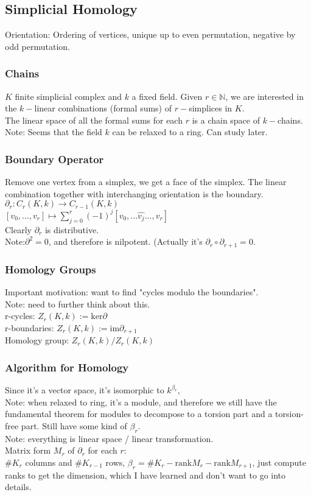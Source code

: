 \documentclass[10pt,a4paper]{report}
\begin{document}
\subsection{Simplicial Homology}
Orientation: Ordering of vertices, unique up to even permutation, negative by odd permutation.
\subsubsection{Chains}
$K$ finite simplicial complex and $k$ a fixed field. Given $r\in\mathbb{N}$, we are interested in the $k-$linear combinations (formal sums) of $r-$simplices in $K$.\\
The linear space of all the formal sums for each $r$ is a chain space of $k-$chains.\\
Note: Seems that the field $k$ can be relaxed to a ring. Can study later.\\
\subsubsection{Boundary Operator}
Remove one vertex from a simplex, we get a face of the simplex. The linear combination together with interchanging orientation is the boundary.\\
$\partial_r:C_r(K,k)\to C_{r-1}(K,k)$\\
$[v_0,...,v_r]\mapsto\sum_{j=0}^{r}(-1)^{j}[v_0,...\hat{v_j}...,v_r]$\\
Clearly $\partial_r$ is distributive.\\
Note:$\partial^2=0$, and therefore is nilpotent. (Actually it's $\partial_r\circ\partial_{r+1}=0$.
\subsubsection{Homology Groups}
Important motivation: want to find "cycles modulo the boundaries".\\
Note: need to further think about this.\\
r-cycles: $Z_r(K,k):=\text{ker}\partial$\\
r-boundaries: $Z_r(K,k):=\text{im}\partial_{r+1}$\\
Homology group: $Z_r(K,k)/Z_r(K,k)$\\
\subsubsection{Algorithm for Homology}
Since it's a vector space, it's isomorphic to $k^{\beta_r}$,\\
Note: when relaxed to ring, it's a module, and therefore we still have the fundamental theorem for modules to decompose to a torsion part and a torsion-free part. Still have some kind of $\beta_r$.\\
Note: everything is linear space / linear transformation.\\
Matrix form $M_r$ of $\partial_r$ for each $r$:\\
$\#K_r$ columns and $\#K_{r-1}$ rows, $\beta_r=\#K_r-\text{rank}M_r-\text{rank}M_{r+1}$, just compute ranks to get the dimension, which I have learned and don't want to go into details.\\
\end{document}
